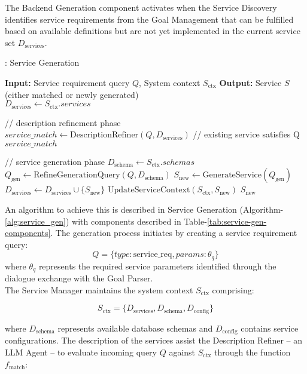 
The Backend Generation component activates when the Service Discovery identifies service requirements from the Goal Management that can be fulfilled based on available definitions but are not yet implemented in the current service set $D_{\text{services}}$. 
\begin{algorithm}
\caption{: Service Generation}
\label{alg:service_gen}
\begin{algorithmic}[1] %
\State \textbf{Input:} Service requirement query $Q$, System context $S_{\text{ctx}}$
\State \textbf{Output:} Service $S$ (either matched or newly generated)
\\
    \State $D_{\text{services}} \gets S_{\text{ctx}}.services$
    
    \State // description refinement phase
    \State $service\_match \gets \text{DescriptionRefiner}(Q, D_{\text{services}})$
        \State // existing service satisfies Q
        \State \Return $service\_match$
    \EndIf
    
    \State // service generation phase
    \State $D_{\text{schema}} \gets S_{\text{ctx}}.schemas$
    \State $Q_{\text{gen}} \gets \text{RefineGenerationQuery}(Q, D_{\text{schema}})$
    \State $S_{\text{new}} \gets \text{GenerateService}(Q_{\text{gen}})$
    \State $D_{\text{services}} \gets D_{\text{services}} \cup \{S_{\text{new}}\}$
    \State $\text{UpdateServiceContext}(S_{\text{ctx}}, S_{\text{new}})$
    \State \Return $S_{\text{new}}$
\EndFunction
\end{algorithmic}
\end{algorithm}
An algorithm to achieve this is described in Service Generation (Algorithm-\ref{alg:service_gen}) with components described in Table-\ref{tab:service-gen-components}. The generation process initiates by creating a service requirement query:
\[
Q = \{
    type: \text{service\_req},
    params: \theta_q
\}
\]
where $\theta_q$ represents the required service parameters  identified through the dialogue exchange with the Goal Parser. \\

The Service Manager maintains the system context $S_{\text{ctx}}$ comprising:

\[
S_{\text{ctx}} = \{
    D_{\text{services}},
    D_{\text{schema}},
    D_{\text{config}}
\}
\]

where $D_{\text{schema}}$ represents available database schemas and $D_{\text{config}}$ contains service configurations. The description of the services assist the Description Refiner -- an LLM Agent -- to evaluate incoming query $Q$ against $S_{\text{ctx}}$ through the function $f_{\text{match}}$:

